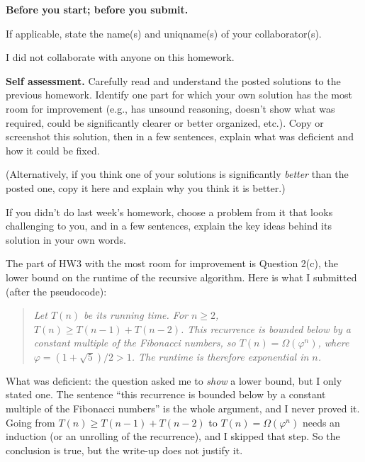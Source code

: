 \documentclass[11pt,addpoints,answers]{exam}
\begin{document}
\hwpreface

\begin{questions}

  \addtocounter{question}{-1}
  \question \textbf{Before you start; before you submit.}

      

    If applicable, state the name(s) and uniqname(s) of your collaborator(s).

    \begin{solution}
      I did not collaborate with anyone on this homework.
    \end{solution}


\question[10] \textbf{Self assessment.} \nopagebreak
  Carefully read and understand the posted solutions to the previous homework.
  Identify one part for which your own solution has the most room for improvement (e.g., has unsound reasoning, doesn’t show what was required, could be significantly clearer or better organized, etc.).
  Copy or screenshot this solution, then in a few sentences, explain what was deficient and how it could be fixed.

  (Alternatively, if you think one of your solutions is significantly \emph{better} than the posted one, copy it here and explain why you think it is better.)

  If you didn't do last week's homework, choose a problem from it that looks challenging to you, and in a few sentences, explain the key ideas behind its solution in your own words.

  \begin{solution}
    The part of HW3 with the most room for improvement is Question 2(c), the lower bound on the runtime of the recursive  algorithm.
    Here is what I submitted (after the pseudocode):

    \begin{quote}
      \emph{Let $T(n)$ be its running time. For $n \ge 2$, $T(n) \ge T(n-1) + T(n-2)$. This recurrence is bounded below by a constant multiple of the Fibonacci numbers, so $T(n) = \Omega(\varphi^n)$, where $\varphi = (1+\sqrt{5})/2 > 1$. The runtime is therefore exponential in $n$.}
    \end{quote}

    What was deficient: the question asked me to \emph{show} a lower bound, but I only stated one.
    The sentence ``this recurrence is bounded below by a constant multiple of the Fibonacci numbers'' is the whole argument, and I never proved it.
    Going from $T(n) \ge T(n-1)+T(n-2)$ to $T(n) = \Omega(\varphi^n)$ needs an induction (or an unrolling of the recurrence), and I skipped that step.
    So the conclusion is true, but the write-up does not justify it.


\end{solution}
\end{questions}
\end{document}
